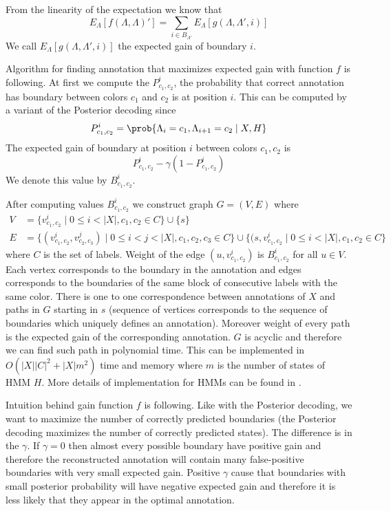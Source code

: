 From the linearity of the expectation we know that
\[E_{\Lambda}[f(\Lambda,\Lambda)']=\sum_{i\in
B_{\Lambda'}}E_{\Lambda}[g(\Lambda,\Lambda',i)]\] We call
$E_{\Lambda}[g(\Lambda,\Lambda',i)]$ the expected gain of boundary $i$.


Algorithm for finding annotation that maximizes expected gain with function $f$
is following. At first we compute the $P^i_{c_1,c_2}$, the probability that correct annotation
has boundary between colors $c_1$ and $c_2$ is at position $i$. This can be
computed by a variant of the Posterior decoding
since 
\[P_{c_1,c_2}^i=\prob{\Lambda_i=c_1,\Lambda_{i+1}=c_2\mid X,H}\]  
  The expected gain of
boundary at position $i$ between colors $c_1,c_2$  is 
\[P^i_{c_1,c_2}-\gamma (1-P^i_{c_1,c_2})\]
We denote this value by  $B^i_{c_1,c_2}$.

After computing values $B^i_{c_1,c_2}$ we construct graph $G=(V,E)$ where
\begin{align*}
V&=\{v^i_{c_1,c_2}\mid 0\leq i<|X|,c_1,c_2\in C\}\cup\{s\}\\
E&=\{(v^i_{c_1,c_2},v^j_{c_2,c_3})\mid 0\leq i<j< |X|, c_1,c_2,c_3\in C
\}\cup\{(s,v^i_{c_1,c_2}\mid 0\leq i< |X|, c_1,c_2\in C\} 
\end{align*}
where $C$ is the set
of labels. Weight of the edge $(u,v^i_{c_1,c_2})$ is $B^i_{c_1,c_2}$ for all $u\in
V$. Each vertex corresponds to the boundary in the annotation and edges
corresponds to the boundaries of the same block of consecutive labels with the same
color.
There is one to one correspondence between annotations of $X$ and paths in
$G$ starting in $s$ (sequence of vertices corresponds to the sequence of
boundaries which uniquely defines an annotation). Moreover weight of every path
is the expected gain of
the corresponding annotation. $G$ is acyclic and therefore we can find such path in
polynomial time. This can be implemented in $O(|X||C|^2+|X|m^2)$ time and memory
where $m$ is the number of states of HMM $H$. More details of implementation
for HMMs can be found in
\cite{Nanasi2010mgr}.

Intuition behind gain function $f$ is following. Like with the Posterior
decoding, we want to maximize the number of correctly predicted boundaries (the
Posterior decoding maximizes the number of correctly predicted states). The
difference is in the $\gamma$. If $\gamma=0$ then almost every possible boundary
have positive gain and therefore the reconstructed annotation will contain many
false-positive boundaries with very small expected gain. Positive $\gamma$ cause
that boundaries with small posterior probability will have negative expected
gain and therefore it is less likely that they appear in the optimal annotation.


